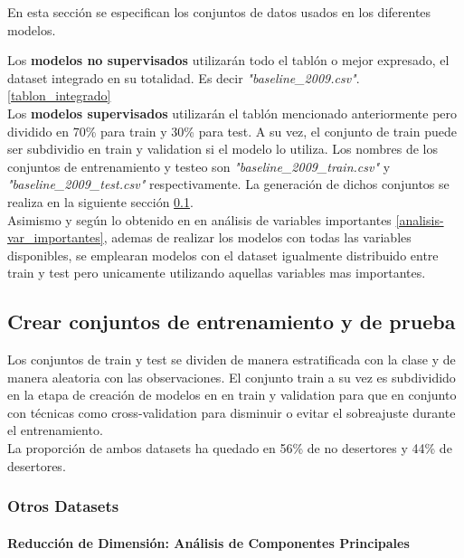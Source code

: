 
En esta sección se especifican los conjuntos de datos usados en los diferentes modelos.

Los \textbf{modelos no supervisados} utilizarán todo el tablón o mejor expresado, el dataset integrado en su totalidad. Es decir \textit{"baseline\_2009.csv"}. \ref{tablon_integrado} \\

Los \textbf{modelos supervisados} utilizarán el tablón mencionado anteriormente pero dividido en 70\% para train y 30\% para test. A su vez, el conjunto de train puede ser subdividio en train y validation si el modelo lo utiliza.
Los nombres de los conjuntos de entrenamiento y testeo son \textit{"baseline\_2009\_train.csv"} y \textit{"baseline\_2009\_test.csv"} respectivamente.
La generación de dichos conjuntos se realiza en la siguiente sección \ref{dataset_train_test}.\\
Asimismo y según lo obtenido en en análisis de variables importantes \ref{analisis-var_importantes}, ademas de realizar los modelos con todas las variables disponibles, se emplearan modelos con el dataset igualmente distribuido entre train y test pero unicamente utilizando aquellas variables mas importantes.

\subsection{Crear conjuntos de entrenamiento y de prueba}\label{dataset_train_test}

Los conjuntos de train y test se dividen de manera estratificada con la clase y de manera aleatoria con las observaciones. El conjunto train a su vez es subdividido en la etapa de creación de modelos en en train y validation para que en conjunto con técnicas como cross-validation para disminuir o evitar el sobreajuste durante el entrenamiento.\\

La proporción de ambos datasets ha quedado en 56\% de no desertores y 44\% de desertores.



\subsubsection{Otros Datasets}

\paragraph{Reducción de Dimensión: Análisis de Componentes Principales}\label{anuxe1lisis-de-componentes-principales}

